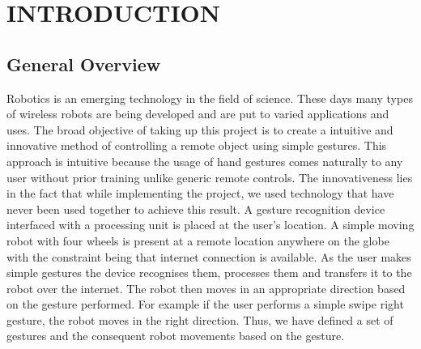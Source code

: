 
\chapter{INTRODUCTION} %
\section{General Overview} %
Robotics is an emerging technology in the field of science. These days many types of wireless robots are being developed and are put to varied applications and uses. The broad objective of taking up this project is to create a intuitive and innovative method of controlling a remote object using simple gestures. This approach is intuitive because the usage of hand gestures comes naturally to any user without prior training unlike generic remote controls. The innovativeness lies in the fact that while implementing the project, we used technology that have never been used together to achieve this result. A gesture recognition device interfaced with a processing unit is placed at the user's location. A simple moving robot with four wheels is present at a remote location anywhere on the globe with the constraint being that internet connection is available. As the user makes simple gestures the device recognises them, processes them and transfers it to the robot over the internet. The robot then moves in an appropriate direction based on the gesture performed. For example if the user performs a simple swipe right gesture, the robot moves in the right direction. Thus, we have defined a set of gestures and the consequent robot movements based on the gesture.
